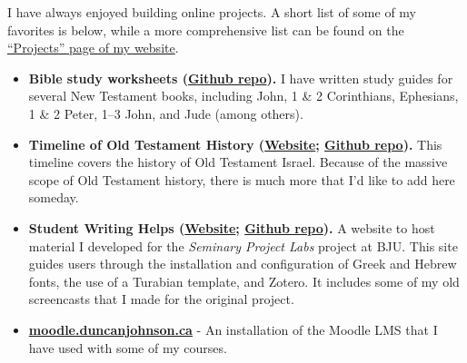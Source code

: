 
I have always enjoyed building online projects. A short list of some of my favorites is below, while a more comprehensive list can be found on the \href{http://duncanjohnson.ca/projects/}{``Projects'' page of my website}.

\begin{itemize}
\item \textbf{Bible study worksheets (\href{https://github.com/dtjohnso/bible-study-worksheets}{Github repo}).} I have written study guides for several New Testament books, including John, 1 \& 2 Corinthians, Ephesians, 1 \& 2 Peter, 1--3 John, and Jude (among others).
\item \textbf{Timeline of Old Testament History (\href{http://duncanjohnson.ca/OT-Timeline/}{Website}; \href{https://github.com/dtjohnso/OT-Timeline}{Github repo}).} This timeline covers the history of Old Testament Israel. Because of the massive scope of Old Testament history, there is much more that I'd like to add here someday.
\item \textbf{Student Writing Helps (\href{http://duncanjohnson.ca/Student-Writing-Helps/}{Website}; \href{https://github.com/dtjohnso/Student-Writing-Helps}{Github repo}).} A website to host material I developed for the \textit{Seminary Project Labs} project at BJU. This site guides users through the installation and configuration of Greek and Hebrew fonts, the use of a Turabian template, and Zotero. It includes some of my old screencasts that I made for the original project.
\item \textbf{\href{http://moodle.duncanjohnson.ca/}{moodle.duncanjohnson.ca}} - An installation of the Moodle LMS that I have used with some of my courses.
\end{itemize}